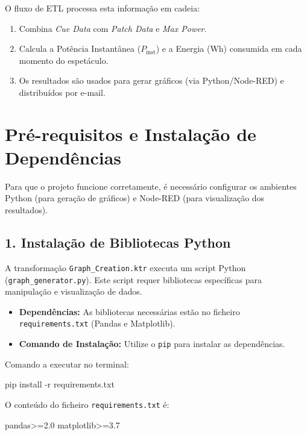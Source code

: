 \documentclass[a4paper, 12pt]{article}
\begin{document}
	O fluxo de ETL processa esta informação em cadeia:
	\begin{enumerate}
		\item Combina \textit{Cue Data} com \textit{Patch Data} e \textit{Max Power}.
		\item Calcula a Potência Instantânea ($P_{\text{inst}}$) e a Energia ($\text{Wh}$) consumida em cada momento do espetáculo.
		\item Os resultados são usados para gerar gráficos (via Python/Node-RED) e distribuídos por e-mail.
	\end{enumerate}
	
	\section{Pré-requisitos e Instalação de Dependências}
	Para que o projeto funcione corretamente, é necessário configurar os ambientes Python (para geração de gráficos) e Node-RED (para visualização dos resultados).
	
	\subsection{1. Instalação de Bibliotecas Python}
	A transformação \texttt{Graph\_Creation.ktr} executa um script Python (\texttt{graph\_generator.py}). Este script requer bibliotecas específicas para manipulação e visualização de dados.
	
	\begin{itemize}
		\item \textbf{Dependências:} As bibliotecas necessárias estão no ficheiro \texttt{requirements.txt} (Pandas e Matplotlib).
		\item \textbf{Comando de Instalação:} Utilize o \texttt{pip} para instalar as dependências.
	\end{itemize}
	Comando a executar no terminal:
	\begin{KettleCode}
		pip install -r requirements.txt
	\end{KettleCode}
	O conteúdo do ficheiro \texttt{requirements.txt} é:
	\begin{KettleCode}
		pandas>=2.0
		matplotlib>=3.7
	\end{KettleCode}
	
\end{document}
